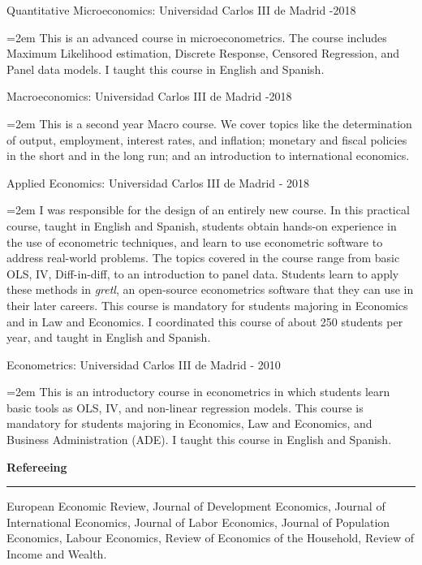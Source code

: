 \documentclass[12pt]{article}
\newcommand{\sepspace}{\vspace*{1em}}		%
\newcommand{\NewPart}[1]{ \vspace*{0.4cm} \noindent \large \textbf{#1}
\par \normalsize \normalfont \vspace*{-0.5cm} \noindent\rule{\textwidth}{1.8pt} \vspace*{-0.75cm} }
\newcommand{\ConferenceEntry}[2]{
		\noindent
		#1		   %
		\hspace{0em} #2 \par}     %
\newcommand{\EducationEntry}[4]{
		\noindent #1 \hfill      %
		\noindent #2 %
		\noindent \textit{#3} \par        %
		\noindent\hangindent=2em\hangafter=0  #4 %
		\normalsize \par}
\begin{document}
\EducationEntry{Quantitative Microeconomics: Universidad Carlos III de Madrid }{2017-2018}{}{This is an advanced course in microeconometrics. The course includes Maximum Likelihood estimation, Discrete Response, Censored Regression, and Panel data models. I taught this course in English and Spanish.}

\EducationEntry{Macroeconomics: Universidad Carlos III de Madrid }{2017-2018}{}{This is a second year Macro course. We cover topics like the determination of output, employment, interest rates, and inflation; monetary and fiscal policies in the short and in the long run; and an introduction to international economics.}

\EducationEntry{Applied Economics: Universidad Carlos III de Madrid }{2011 - 2018}{}{I was responsible for the design of an entirely new course. In this practical course, taught in English and Spanish, students obtain hands-on experience in the use of econometric techniques, and learn to use econometric software to address real-world problems. The topics covered in the course range from basic OLS, IV, Diff-in-diff, to an introduction to panel data. Students learn to apply these methods in \textit{gretl}, an open-source econometrics software that they can use in their later careers. This course is mandatory for students majoring in Economics and in Law and Economics. I coordinated this course of about 250 students per year, and taught in English and Spanish.}
\vspace*{0.5cm}
\EducationEntry{Econometrics: Universidad Carlos III de Madrid}{2008 - 2010}{}{This is an introductory course in econometrics in which students learn basic tools as OLS, IV, and non-linear regression models. This course is mandatory for students majoring in Economics, Law and Economics, and Business Administration (ADE). I taught this course in English and Spanish.}

%
%
%


\vspace*{-0.25cm}
\NewPart{Refereeing}{}

\ConferenceEntry{European Economic Review, Journal of Development Economics, Journal of International Economics, Journal of Labor Economics, Journal of Population Economics, Labour Economics, Review of Economics of the Household, Review of Income and Wealth.}{}
\end{document}
